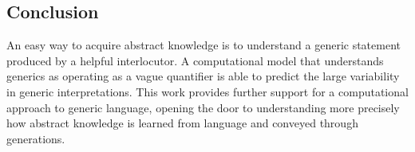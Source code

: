 \documentclass[floatsintext,man]{apa6}
\begin{document}
\hypertarget{conclusion}{%
\subsection{Conclusion}\label{conclusion}}

An easy way to acquire abstract knowledge is to understand a generic statement produced by a helpful interlocutor. 
A computational model that understands generics as operating as a vague quantifier is able to predict the large variability in generic interpretations.
This work provides further support for a computational approach to generic language, opening the door to understanding more precisely how abstract knowledge is learned from language and conveyed through generations.

\newpage



\end{document}
